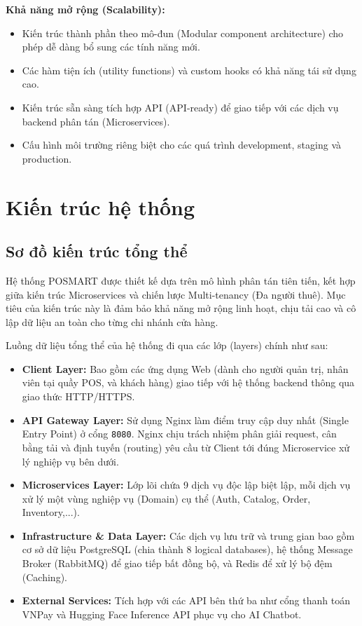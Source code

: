 \documentclass[12pt,a4paper]{report}
\begin{document}
\textbf{Khả năng mở rộng (Scalability):}
\begin{itemize}
    \item Kiến trúc thành phần theo mô-đun (Modular component architecture) cho phép dễ dàng bổ sung các tính năng mới.
    \item Các hàm tiện ích (utility functions) và custom hooks có khả năng tái sử dụng cao.
    \item Kiến trúc sẵn sàng tích hợp API (API-ready) để giao tiếp với các dịch vụ backend phân tán (Microservices).
    \item Cấu hình môi trường riêng biệt cho các quá trình development, staging và production.
\end{itemize}

\section{Kiến trúc hệ thống}

\subsection{Sơ đồ kiến trúc tổng thể}

Hệ thống POSMART được thiết kế dựa trên mô hình phân tán tiên tiến, kết hợp giữa kiến trúc Microservices và chiến lược Multi-tenancy (Đa người thuê). Mục tiêu của kiến trúc này là đảm bảo khả năng mở rộng linh hoạt, chịu tải cao và cô lập dữ liệu an toàn cho từng chi nhánh cửa hàng. 

Luồng dữ liệu tổng thể của hệ thống đi qua các lớp (layers) chính như sau:
\begin{itemize}
    \item \textbf{Client Layer:} Bao gồm các ứng dụng Web (dành cho người quản trị, nhân viên tại quầy POS, và khách hàng) giao tiếp với hệ thống backend thông qua giao thức HTTP/HTTPS.
    \item \textbf{API Gateway Layer:} Sử dụng Nginx làm điểm truy cập duy nhất (Single Entry Point) ở cổng \texttt{8080}. Nginx chịu trách nhiệm phân giải request, cân bằng tải và định tuyến (routing) yêu cầu từ Client tới đúng Microservice xử lý nghiệp vụ bên dưới.
    \item \textbf{Microservices Layer:} Lớp lõi chứa 9 dịch vụ độc lập biệt lập, mỗi dịch vụ xử lý một vùng nghiệp vụ (Domain) cụ thể (Auth, Catalog, Order, Inventory,...).
    \item \textbf{Infrastructure \& Data Layer:} Các dịch vụ lưu trữ và trung gian bao gồm cơ sở dữ liệu PostgreSQL (chia thành 8 logical databases), hệ thống Message Broker (RabbitMQ) để giao tiếp bất đồng bộ, và Redis để xử lý bộ đệm (Caching).
    \item \textbf{External Services:} Tích hợp với các API bên thứ ba như cổng thanh toán VNPay và Hugging Face Inference API phục vụ cho AI Chatbot.
\end{itemize}
\end{document}
